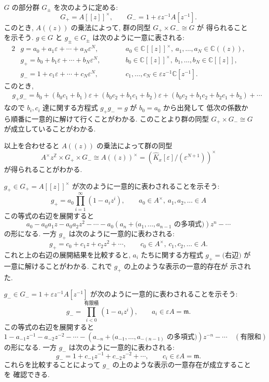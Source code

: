 \documentclass[12pt,twoside]{jarticle}
\newcommand\Z{{\mathbb Z}} %
\newcommand\C{{\mathbb C}} %
\theoremstyle{definition} %
\theoremstyle{definition} %
\theoremstyle{definition} %
\numberwithin{theorem}{section}
\numberwithin{equation}{section}
\numberwithin{figure}{section}
\numberwithin{table}{section}
\newcommand\Khat{{\widehat K}}
\newcommand\eps{\varepsilon}
\newcommand\m{{\mathfrak m}}
\begin{document}
$G$ の部分群 $G_\pm$ を次のように定める:
\[
G_+ = A[[z]]^\times, \qquad
G_- = 1+\eps z^{-1}A[z^{-1}].
\]
このとき, $A((z))$ の乗法によって, 群の同型 $G_+\times G_-\cong G$ が
得られることを示そう.
$g\in G$ と $g_\pm\in G_\pm$ は次のように一意に表される:
\begin{alignat*}{2}
&
g = a_0+a_1\eps+\cdots+a_N\eps^N, \qquad
& &
a_0\in \C[[z]]^\times,\ a_1,\ldots,a_N\in\C((z)),
\\ &
g_+ = b_0+b_1\eps+\cdots+b_N\eps^N, \qquad
& &
b_0\in\C[[z]]^\times,\ b_1,\ldots,b_N\in\C[[z]],
\\ &
g_- = 1+c_1\eps+\cdots+c_N\eps^N, \qquad
& &
c_1,\ldots,c_N\in\eps z^{-1}\C[z^{-1}].
\end{alignat*}
このとき,
\begin{align*}
&
g_+g_-
= b_0 + (b_0c_1+b_1)\eps + (b_0c_2+b_1c_1+b_2)\eps
+ (b_0c_2+b_1c_2+b_2c_1+b_3)+\cdots
\end{align*}
なので $b_i,c_i$ 達に関する方程式 $g_+g_-=g$ が $b_0=a_0$ から出発して
低次の係数から順番に一意的に解けて行くことがわかる.
このことより群の同型 $G_+\times G_-\cong G$ が成立していることがわかる.

以上を合わせると $A((z))$ の乗法によって群の同型
\[
 A^\times z^\Z\times G_+\times G_- \cong A((z))^\times
= \left(\Khat_x[\eps]/(\eps^{N+1})\right)^\times
\]
が得られることがわかる.

$g_+\in G_+=A[[z]]^\times$ が次のように一意的に表わされることを示そう:
\[
 g_+ = a_0\prod_{i=1}^\infty(1-a_i z^i), \qquad
 a_0\in A^\times,\ a_1,a_2,\ldots\in A
\]
この等式の右辺を展開すると
\[
a_0 - a_0a_1 z - a_0a_2 z^2
- \cdots - a_0(a_n + \text{($a_1,\ldots,a_{n-1}$ の多項式)})z^n
- \cdots
\]
の形になる. 一方 $g_+$ は次のように一意的に表わされる:
\[
g_+ = c_0 + c_1 z + c_2 z^2 + \cdots, \qquad
c_0\in A^\times,\ c_1,c_2,\ldots\in A.
\]
これと上の右辺の展開結果を比較すると, $a_i$ たちに関する方程式 $g_+=\text{(右辺)}$ が
一意に解けることがわかる. これで $g_+$ の上のような表示の一意的存在が
示された.

$g_-\in G_-=1+\eps z^{-1}A[z^{-1}]$ が次のように一意的に表わされることを示そう:
\[
g_- = \prod_{i<0}^{\text{有限積}} (1-a_i z^i), \qquad
a_i\in \eps A=\m.
\]
この等式の右辺を展開すると
\[
1 - a_{-1} z^{-1} - a_{-2} z^{-2}
- \cdots - (a_{-n} + \text{($a_{-1},\ldots,a_{-(n-1)}$ の多項式)})z^{-n}
- \cdots \quad (\text{有限和})
\]
の形になる. 一方 $g_-$ は次のように一意的に表わされる:
\[
g_-=1+c_{-1}z^{-1}+c_{-2}z^{-2}+\cdots, \qquad
c_i\in\eps A=\m.
\]
これらを比較することによって $g_-$ の上のような表示の一意存在が成立することを
確認できる.
\end{document}
